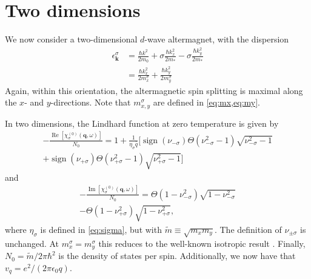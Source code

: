 \documentclass[aps,prb,reprint,twocolumns,superscriptaddress,nofootinbib]{revtex4-2}
\DeclareMathOperator{\sign}{sign}
\DeclareMathOperator{\Imm}{Im}
\DeclareMathOperator{\Ree}{Re}
\newcommand{\mdos}{\tilde{m}}
\begin{document}
	\section{Two dimensions}
	We now consider a two-dimensional $d$-wave altermagnet, with the dispersion
	\begin{align}
		\epsilon_{\bm k}^\sigma &= \frac{\hbar k^2}{2m_0} + \sigma \frac{\hbar k_x^2}{2m_*} - \sigma \frac{\hbar k_y^2}{2m_*} \\
		&=\frac{\hbar k_x^2}{2m_x^\sigma}+ \frac{\hbar k_y^2}{2m_y^\sigma}
	\end{align}
	Again, within this orientation, the altermagnetic spin splitting is maximal along the $x$- and $y$-directions. Note that $m_{x,y}^\sigma$ are defined in \cref{eq:mx,eq:my}.
	
	In two dimensions, the Lindhard function at zero temperature is given by \cite{ahnAnisotropicFermionicQuasiparticles2021}
	\begin{multline}
		-\frac{\Ree[\chi_\sigma^{(0)} (\bm q,\omega) ]}{N_0 }= 1 + \frac{1}{\eta_\sigma \bar q} \bigg[\sign(\nu_{-\sigma}) \Theta(\nu_{-\sigma}^2-1)\sqrt{\nu_{-\sigma}^2-1}\\+\sign(\nu_{+\sigma}) \Theta(\nu_{+\sigma}^2-1)\sqrt{\nu_{+\sigma}^2-1}\bigg]
	\end{multline}
	and 
	\begin{multline}
		-\frac{\Imm[\chi_\sigma^{(0)} (\bm q,\omega) ]}{ N_0}=\Theta(1-\nu_{-\sigma}^2)\sqrt{1-\nu_{-\sigma}^2}\\-\Theta(1-\nu_{+\sigma}^2)\sqrt{1-\nu_{+\sigma}^2},
	\end{multline}
	where $\eta_\sigma$ is defined in \cref{eq:sigma}, but with
	$\mdos\equiv \sqrt{m_xm_y}$. The definition of $\nu_{\pm\sigma}$ is unchanged. At $m_x^\sigma=m_y^\sigma$ this reduces to the well-known isotropic result \cite{giulianiQuantumTheoryElectron2005}. Finally, $N_0=\mdos/2\pi\hbar^2$ is the density of states per spin.
	Additionally, we now have that $v_q=e^2/(2\pi\epsilon_0 q)$.
	
	
	
\end{document}
